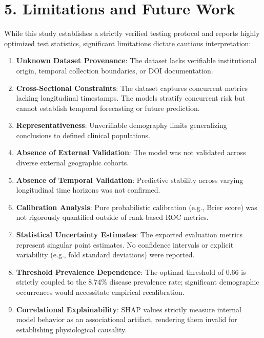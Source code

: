 \documentclass[conference]{IEEEtran}
\begin{document}
\section{5. Limitations and Future Work}
While this study establishes a strictly verified testing protocol and reports highly optimized test statistics, significant limitations dictate cautious interpretation:
\begin{enumerate}
\item \textbf{Unknown Dataset Provenance}: The dataset lacks verifiable institutional origin, temporal collection boundaries, or DOI documentation. 
\item \textbf{Cross-Sectional Constraints}: The dataset captures concurrent metrics lacking longitudinal timestamps. The models stratify concurrent risk but cannot establish temporal forecasting or future prediction.
\item \textbf{Representativeness}: Unverifiable demography limits generalizing conclusions to defined clinical populations. 
\item \textbf{Absence of External Validation}: The model was not validated across diverse external geographic cohorts.
\item \textbf{Absence of Temporal Validation}: Predictive stability across varying longitudinal time horizons was not confirmed.
\item \textbf{Calibration Analysis}: Pure probabilistic calibration (e.g., Brier score) was not rigorously quantified outside of rank-based ROC metrics.
\item \textbf{Statistical Uncertainty Estimates}: The exported evaluation metrics represent singular point estimates. No confidence intervals or explicit variability (e.g., fold standard deviations) were reported.
\item \textbf{Threshold Prevalence Dependence}: The optimal threshold of 0.66 is strictly coupled to the 8.74\% disease prevalence rate; significant demographic occurrences would necessitate empirical recalibration.
\item \textbf{Correlational Explainability}: SHAP values strictly measure internal model behavior as an associational artifact, rendering them invalid for establishing physiological causality.
\end{enumerate}
\end{document}
